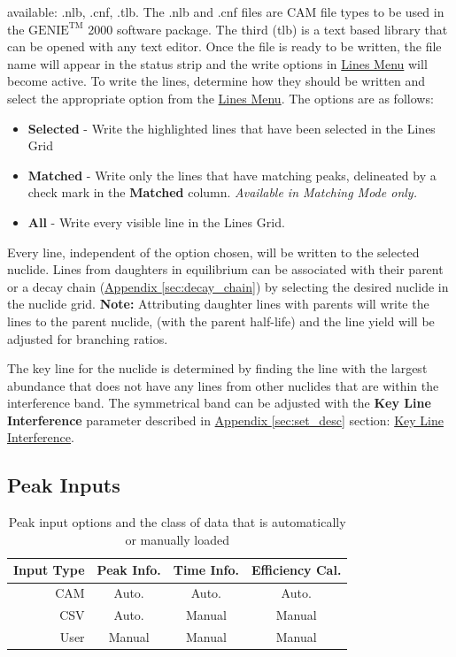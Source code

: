 \documentclass[12pt,report,justified]{SANDreport}
\begin{document}
available: .nlb, .cnf, .tlb. The .nlb and .cnf files are CAM file types to be used in the \(\text{GENIE}^\text{TM}\)
2000 software package. The third (tlb) is a text based library that can be opened with any text editor. Once the
file is ready to be written, the file name will appear in the status strip and the write options in
\hyperref[sec:line_menu]{Lines Menu} will become active. To write the lines, determine how they should be written
and select the appropriate option from the \hyperref[sec:line_menu]{Lines Menu}. The options are as follows:
\begin{itemize}
    \item \textbf{Selected} - Write the highlighted lines that have been selected in the Lines Grid
    \item \textbf{Matched} -  Write only the lines that have matching peaks, delineated by a check mark in the
    \textbf{Matched} column. \textit{Available in Matching Mode only.}
    \item \textbf{All} - Write every visible line in the Lines Grid.
\end{itemize}

Every line, independent of the option chosen, will be written to the selected nuclide. Lines from daughters
in equilibrium can be associated with their parent or a decay chain
(\hyperref[sec:decay_chain]{Appendix \ref{sec:decay_chain}}) by selecting the desired
nuclide in the nuclide grid. \textbf{Note:} Attributing daughter lines with parents will write the lines to the
parent nuclide, (with the parent half-life) and the line yield will be adjusted for branching ratios.

The key line for the nuclide is determined by finding the line with the largest abundance that does
not have any lines from other nuclides that are within the interference band. The symmetrical band
can be adjusted with the \textbf{Key Line Interference} parameter described in
\hyperref[sec:set_desc]{Appendix \ref{sec:set_desc}} section:
\hyperref[itm:ky_inf]{Key Line Interference}.

\subsection{Peak Inputs}\label{sec:peak_inp}
\begin{table}[h!]
    \centering
    \caption{Peak input options and the class of data that is automatically or manually loaded}
    \begin{tabular} {r|c|c|c}
        \hline
        Input Type & Peak Info. & Time Info. & Efficiency Cal. \\
        \hline
        CAM & Auto. & Auto. & Auto.\\
        CSV & Auto. & Manual & Manual \\
        User & Manual & Manual & Manual \\
        \hline
    \end{tabular}
   \label{tab:peak_inp}
\end{table}
\end{document}
